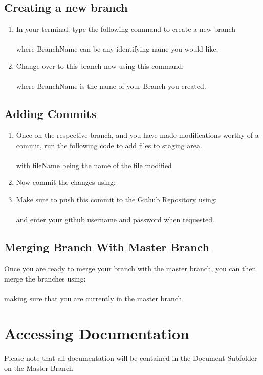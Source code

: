 \documentclass[12pt]{article}
\begin{document}
\subsection{Creating a new branch}
\begin{enumerate}
    \item In your terminal, type the following command to create a new branch\\
    \\
    where BranchName can be any identifying name you would like.
    \item Change over to this branch now using this command:\\
    \\
    where BranchName is the name of your Branch you created.
\end{enumerate}

\subsection{Adding Commits}
\begin{enumerate}
    \item Once on the respective branch, and you have made modifications worthy of a commit, run the following code to add files to staging area.\\
    \\
    with fileName being the name of the file modified
    \item Now commit the changes using:\\
    \item Make sure to push this commit to the Github Repository using:\\
    \\
    and enter your github username and password when requested.
\end{enumerate}

\subsection{Merging Branch With Master Branch}
Once you are ready to merge your branch with the master branch, you can then merge the branches using:\\
\\
making sure that you are currently in the master branch.

\section{Accessing Documentation}
Please note that all documentation will be contained in the Document Subfolder on the Master Branch
\end{document}
